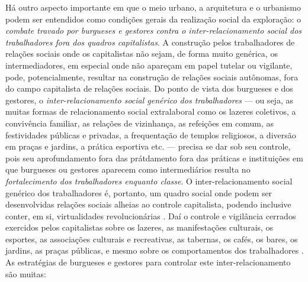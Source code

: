 Há outro aspecto importante em que o meio urbano, a arquitetura e o urbanismo podem ser entendidos como condições gerais da realização social da exploração: o \textit{combate travado por burgueses e gestores contra o inter-relacionamento social dos trabalhadores fora dos quadros capitalistas}. A construção pelos trabalhadores de relações sociais onde os capitalistas não sejam, de forma muito genérica, os intermediadores, em especial onde não apareçam em papel tutelar ou vigilante, pode, potencialmente, resultar na construção de relações sociais autônomas, fora do campo capitalista de relações sociais. Do ponto de vista dos burgueses e dos gestores, o \textit{inter-relacionamento social genérico dos trabalhadores} --- ou seja, as muitas formas de relacionamento social extralaboral como os lazeres coletivos, a convivência familiar, as relações de vizinhança, as refeições em comum, as festividades públicas e privadas, a frequentação de templos religiosos, a diversão em praças e jardins, a prática esportiva etc. --- precisa se dar sob seu controle, pois seu aprofundamento fora das prátdamento fora das práticas e instituições em que burgueses ou gestores aparecem como intermediários resulta no \textit{fortalecimento dos trabalhadores enquanto classe}. O inter-relacionamento social genérico dos trabalhadores é, portanto, um quadro social onde podem ser desenvolvidas relações sociais alheias ao controle capitalista, podendo inclusive conter, em si, virtualidades revolucionárias \cite[p.~329]{BERNARDO1991}. Daí o controle e vigilância cerrados exercidos pelos capitalistas sobre os lazeres, as manifestações culturais, os esportes, as associações culturais e recreativas, as tabernas, os cafés, os bares, os jardins, as praças públicas, e mesmo sobre os comportamentos dos trabalhadores \cite[p.~317]{BERNARDO1991}. As estratégias de burgueses e gestores para controlar este inter-relacionamento são muitas:

